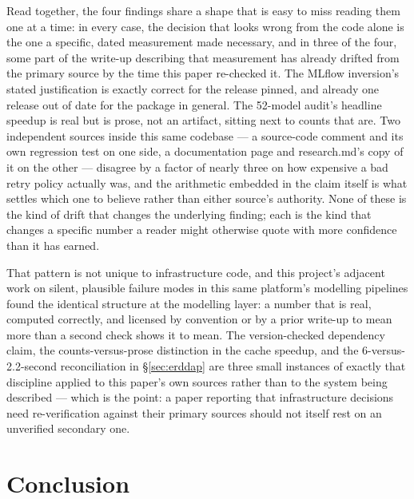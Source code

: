 Read together, the four findings share a shape that is easy to miss reading
them one at a time: in every case, the decision that looks wrong from the
code alone is the one a specific, dated measurement made necessary, and in
three of the four, some part of the write-up describing that measurement has
already drifted from the primary source by the time this paper re-checked
it. The MLflow inversion's stated justification is exactly correct for the
release pinned, and already one release out of date for the package in
general. The 52-model audit's headline speedup is real but is prose, not an
artifact, sitting next to counts that are. Two independent sources inside
this same codebase --- a source-code comment and its own regression test on
one side, a documentation page and research.md's copy of it on the other ---
disagree by a factor of nearly three on how expensive a bad retry policy
actually was, and the arithmetic embedded in the claim itself is what
settles which one to believe rather than either source's authority. None of
these is the kind of drift that changes the underlying finding; each is the
kind that changes a specific number a reader might otherwise quote with more
confidence than it has earned.

That pattern is not unique to infrastructure code, and this project's
adjacent work on silent, plausible failure modes in this same platform's
modelling pipelines found the identical structure at the modelling layer: a
number that is real, computed correctly, and licensed by convention or by a
prior write-up to mean more than a second check shows it to mean. The
version-checked dependency claim, the counts-versus-prose distinction in the
cache speedup, and the 6-versus-2.2-second reconciliation in
\S\ref{sec:erddap} are three small instances of exactly that discipline
applied to this paper's own sources rather than to the system being
described --- which is the point: a paper reporting that infrastructure
decisions need re-verification against their primary sources should not
itself rest on an unverified secondary one.

\section{Conclusion}

